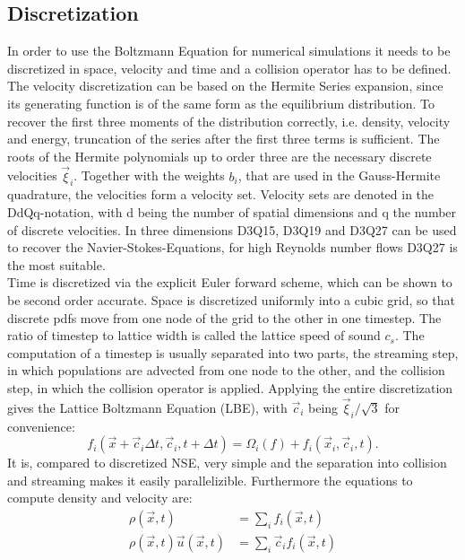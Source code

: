\subsection{Discretization}
In order to use the Boltzmann Equation for numerical simulations it needs to be discretized in space, velocity and time and a collision operator has to be defined. The velocity discretization can be based on the Hermite Series expansion, since its generating function is of the same form as the equilibrium distribution. To recover the first three moments of the distribution correctly, i.e. density, velocity and energy, truncation of the series after the first three terms is sufficient. The roots of the Hermite polynomials up to order three are the necessary discrete velocities $\vec{\xi}_i$. Together with the weights $b_i$, that are used in the Gauss-Hermite quadrature, the velocities form a velocity set. Velocity sets are denoted in the DdQq-notation, with d being the number of spatial dimensions and q the number of discrete velocities. In three dimensions D3Q15, D3Q19 and D3Q27 can be used to recover the Navier-Stokes-Equations, for high Reynolds number flows D3Q27 is the most suitable\cite{kang_effect_2013}. \cite[p. 73-93]{kruger_lattice_2017} \\
Time is discretized via the explicit Euler forward scheme, which can be shown to be second order accurate. Space is discretized uniformly into a cubic grid, so that discrete pdfs move from one node of the grid to the other in one timestep. The ratio of timestep to lattice width is called the lattice speed of sound $c_s$. The computation of a timestep is usually separated into two parts, the streaming step, in which populations are advected from one node to the other, and the collision step, in which the collision operator is applied. Applying the entire discretization gives the Lattice Boltzmann Equation (LBE), with $\vec{c}_i$ being $\vec{\xi}_i/\sqrt{3}$ for convenience:
\begin{equation}
	f_i(\vec{x} + \vec{c}_i \Delta t, \vec{c}_i, t+\Delta t ) = \Omega_i(f) + f_i(\vec{x}_i, \vec{c}_i, t). \label{eq:LBE}	
\end{equation}
 It is, compared to discretized NSE, very simple and the separation into collision and streaming makes it easily parallelizible. Furthermore the equations to compute density and velocity are: \cite[p. 94-98]{kruger_lattice_2017}
\begin{align}
	\rho(\vec{x}, t) &= \sum_i f_i(\vec{x}, t) \label{eq:density_d} \\
	\rho(\vec{x}, t) \vec{u}(\vec{x}, t) &= \sum_i \vec{c}_i f_i(\vec{x}, t) \label{eq:vel_d}
\end{align}
